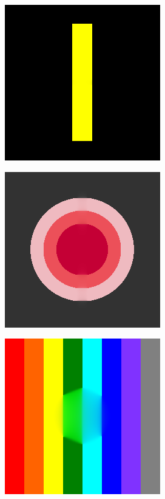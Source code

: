 \begin{figure}[H]
	\centering
	\begin{subfigure}{\ResultSubFigureWidth \linewidth}
		\centering
		\includegraphics[width=\ResultSubFigurePadding \linewidth]{image/result_ex1/fixpoint01.png}
	\end{subfigure}
	\begin{subfigure}{\ResultSubFigureWidth \linewidth}
		\centering
		\includegraphics[width=\ResultSubFigurePadding \linewidth]{image/result_ex1/fixpoint02.png}
	\end{subfigure}
	\begin{subfigure}{\ResultSubFigureWidth \linewidth}
		\centering
		\includegraphics[width=\ResultSubFigurePadding \linewidth]{image/result_ex1/fixpoint03.png}			

\end{subfigure}
\end{figure}
